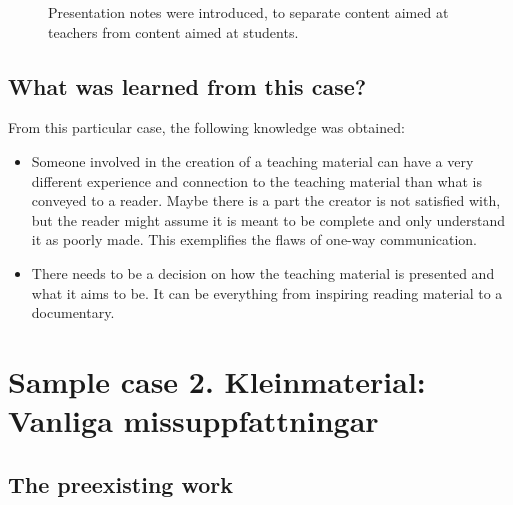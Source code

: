 \begin{figure}[H]
\centering
{}
\caption{Presentation notes were introduced, to separate content aimed at teachers from content aimed at students.}
\label{notes}
\end{figure}

\subsection{What was learned from this case?}
From this particular case, the following knowledge was obtained:
\begin{itemize}
    \item Someone involved in the creation of a teaching material can have a very different experience and connection to the teaching material than what is conveyed to a reader. Maybe there is a part the creator is not satisfied with, but the reader might assume it is meant to be complete and only understand it as poorly made. This exemplifies the flaws of one-way communication.
    \item There needs to be a decision on how the teaching material is presented and what it aims to be. It can be everything from inspiring reading material to a documentary.
\end{itemize}

\section{Sample case 2. Kleinmaterial: Vanliga missuppfattningar} \label{samplecase2}

\subsection{The preexisting work}

